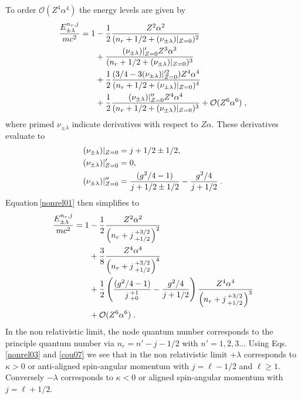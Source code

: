 \documentclass[epj]{svjour}
\begin{document}
To order $\mathcal{O}(Z^{4}\alpha^{4})$ the energy levels are given by
\begin{alignat}{1}
\label{nonrel01} \frac{E^{n_{r},j}_{\pm\lambda}}{mc^{2}}=1&-\frac{1}{2}\frac{Z^{2}\alpha^{2}}{(n_{r}+1/2+(\nu_{\pm\lambda})|_{Z=0})^{2}}\\ 
\notag &+\frac{(\nu_{\pm\lambda})|_{Z=0}'Z^{3}\alpha^{3}}{(n_{r}+1/2+(\nu_{\pm\lambda})|_{Z=0})^{3}}\\ 
\notag&+\frac{1}{2}\frac{(3/4-3(\nu_{\pm\lambda})|_{Z=0}'^{2})Z^{4}\alpha^{4}}{(n_{r}+1/2+(\nu_{\pm\lambda})|_{Z=0})^{4}}\\ 
\notag &+\frac{1}{2}\frac{(\nu_{\pm\lambda})|_{Z=0}^{\prime\prime} Z^{4}\alpha^{4}}{(n_{r}+1/2+(\nu_{\pm\lambda})|_{Z=0})^{3}}+\mathcal{O}(Z^{6}\alpha^{6})\;,\end{alignat}
where primed $\nu_{\pm\lambda}$ indicate derivatives with respect to $Z\alpha$. These derivatives evaluate to
\begin{alignat}{1}
\label{nonrel02} &(\nu_{\pm\lambda})|_{Z=0}=j+1/2\pm1/2,\\ \notag &(\nu_{\pm\lambda})|_{Z=0}'=0,\\ \notag &(\nu_{\pm\lambda})|_{Z=0}^{\prime\prime}=\frac{(g^{2}/4-1)}{j+1/2\pm1/2}-\frac{g^{2}/4}{j+1/2}\;.
\end{alignat}
Equation\,\eqref{nonrel01} then simplifies to
\begin{alignat}{1}
\label{nonrel03} \frac{E^{n_{r},j}_{\pm\lambda}}{mc^{2}}=1&-\frac{1}{2}\frac{Z^{2}\alpha^{2}}{\left(n_{r}+j\begin{smallmatrix}+3/2 \\ +1/2\end{smallmatrix}\right)^{2}}\\
\notag &+\frac{3}{8}\frac{Z^{4}\alpha^{4}}{\left(n_{r}+j\begin{smallmatrix}+3/2 \\ +1/2\end{smallmatrix}\right)^{4}}\\ 
\notag &+\frac{1}{2}\left(\frac{(g^{2}/4-1)}{j\begin{smallmatrix}+1 \\ +0\end{smallmatrix}}-\frac{g^{2}/4}{j+1/2}\right)\frac{Z^{4}\alpha^{4}}{\left(n_{r}+j\begin{smallmatrix}+3/2 \\ +1/2\end{smallmatrix}\right)^{3}}\\
\notag &+\mathcal{O}(Z^{6}\alpha^{6})\;.
\end{alignat}
In the non relativistic limit, the node quantum number corresponds to the principle quantum number via $n_{r}=n'-j-1/2$ with $n'=1,2,3\ldots$ Using Eqs.\,\eqref{nonrel03} and \eqref{cou07} we see that in the non relativistic limit $+\lambda$ corresponds to $\kappa>0$ or anti-aligned spin-angular momentum with $j=\ell-1/2$ and $\ell\geq1$. Conversely $-\lambda$ corresponds to $\kappa<0$ or aligned spin-angular momentum with $j=\ell+1/2$. 
\end{document}
